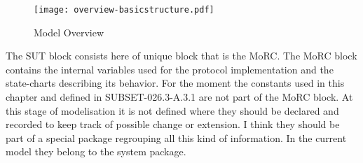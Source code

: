 \begin{figure}[htpb]
\centering
\texttt{[image: overview-basicstructure.pdf]}
\caption{\label{fig:overview} Model Overview}
\end{figure}

The SUT block consists here of unique block that is the MoRC. The MoRC block
contains the internal variables used for the protocol implementation and the
state-charts describing its behavior. 
For the moment the constants used in this chapter and defined in
SUBSET-026.3-A.3.1 are not part of the MoRC block. At this stage of modelisation
it is not defined where they should be declared and recorded to keep track of
possible change or extension. I think they should be part of a special package
regrouping all this kind of information. In the current model they belong to the
system package. 
